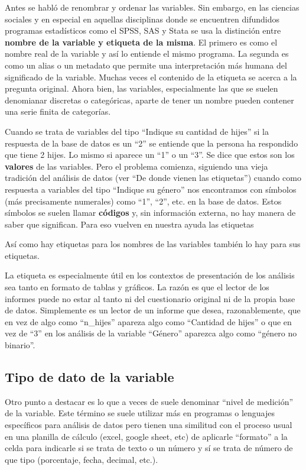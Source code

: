 \documentclass[
  letterpaper,
  DIV=11,
  numbers=noendperiod]{scrreprt}
\begin{document}
Antes se habló de renombrar y ordenar las variables. Sin embargo, en las
ciencias sociales y en especial en aquellas disciplinas donde se
encuentren difundidos programas estadísticos como el SPSS, SAS y Stata
se usa la distinción entre \textbf{nombre de la variable y etiqueta de
la misma}. El primero es como el nombre real de la variable y así lo
entiende el mismo programa. La segunda es como un alias o un metadato
que permite una interpretación más humana del significado de la
variable. Muchas veces el contenido de la etiqueta se acerca a la
pregunta original. Ahora bien, las variables, especialmente las que se
suelen denomianar discretas o categóricas, aparte de tener un nombre
pueden contener una serie finita de categorías.

Cuando se trata de variables del tipo ``Indique su cantidad de hijes''
si la respuesta de la base de datos es un ``2'' se entiende que la
persona ha respondido que tiene 2 hijes. Lo mismo si aparece un ``1'' o
un ``3''. Se dice que estos son los \textbf{valores} de las variables.
Pero el problema comienza, siguiendo una vieja tradición del análisis de
datos (ver ``De donde vienen las etiquetas'') cuando como respuesta a
variables del tipo ``Indique su género'' nos encontramos con símbolos
(más precisamente numerales) como ``1'', ``2'', etc. en la base de
datos. Estos símbolos se suelen llamar \textbf{códigos} y, sin
información externa, no hay manera de saber que significan. Para eso
vuelven en nuestra ayuda las etiquetas

Así como hay etiquetas para los nombres de las variables también lo hay
para sus etiquetas.

La etiqueta es especialmente útil en los contextos de presentación de
los análisis sea tanto en formato de tablas y gráficos. La razón es que
el lector de los informes puede no estar al tanto ni del cuestionario
original ni de la propia base de datos. Simplemente es un lector de un
informe que desea, razonablemente, que en vez de algo como ``n\_hijes''
apareza algo como ``Cantidad de hijes'' o que en vez de ``3'' en los
análisis de la variable ``Género'' aparezca algo como ``género no
binario''.

\hypertarget{tipo-de-dato-de-la-variable}{%
\subsection{Tipo de dato de la
variable}\label{tipo-de-dato-de-la-variable}}

Otro punto a destacar es lo que a veces de suele denominar ``nivel de
medición'' de la variable. Este término se suele utilizar más en
programas o lenguajes específicos para análisis de datos pero tienen una
similitud con el proceso usual en una planilla de cálculo (excel, google
sheet, etc) de aplicarle ``formato'' a la celda para indicarle si se
trata de texto o un número y sí se trata de número de que tipo
(porcentaje, fecha, decimal, etc.).
\end{document}
